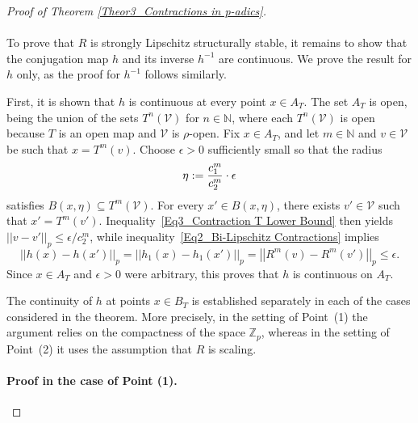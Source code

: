\documentclass[10pt,a4paper]{amsart}
\begin{document}
\begin{proof}[Proof of Theorem \ref{Theor3_Contractions in p-adics}]
		
		
		\paragraph{} 
		
		To prove that $R$ is strongly Lipschitz structurally stable, it remains to show that the conjugation map $h$ and its inverse $h^{-1}$ are continuous. 
		We prove the result for $h$ only, as the proof for $h^{-1}$ follows similarly. 
		
		\medskip
		
		First, it is shown that $h$ is continuous at every point $x \in A_{T}$. The set $A_{T}$ is open, being the union of the sets $T^{n} \left(  \mathcal{V}  \right) $ for $n \in \mathbb{N} $, where each $T^{n} \left(  \mathcal{V}  \right)  $ is open because $T$ is an open map and $\mathcal{V}$ is $\rho$-open. 
		Fix $x \in A_{T} $, and let $m \in \mathbb{N} $ and $v \in \mathcal{V}$ be such that $x = T^{m}(v)$. Choose $  \epsilon > 0$ sufficiently small so that the radius 
		$$  \eta :=   {c_{1}^{m} \over c_{2}^{m}} \cdot  \epsilon $$
		satisfies $B \left(  x,  \eta  \right)  \subseteq T^{m} \left(  \mathcal{V}  \right)  $. 
		For every $x' \in B \left(  x ,  \eta  \right) $, there exists $v' \in \mathcal{V}$ such that $x' = T^{m} \left(  v'  \right) $. Inequality~\eqref{Eq3_Contraction T Lower Bound} then yields  $ \left| \left|  v - v'  \right|  \right|_{p} \le \epsilon / c_{2}^{m}$, while inequality~\eqref{Eq2_Bi-Lipschitz Contractions} implies  
		$$  \left| \left|  h \left(  x  \right)  - h \left(  x'  \right)   \right|  \right|_{p}   =    \left| \left|  h_{1}(x) - h_{1} \left(  x' \right)   \right|  \right|_{p}   =    \left| \left|  R^{m} \left(  v  \right)  - R^{m} \left(  v'  \right)   \right|  \right|_{p}   \le    \epsilon . $$ 	
		Since $x \in A_{T}$ and $\epsilon  > 0$ were arbitrary, this proves that $h$ is continuous on $A_{T}$. 
		
		
		\medskip
		
		The continuity of $h$ at points $x \in B_{T}$ is established separately in each of the cases considered in the theorem. More precisely, in the setting of Point~(1) the argument relies on the compactness of the space $\mathbb{Z}_{p}$, whereas in the setting of Point~(2) it uses the assumption that $R$ is scaling.
		
		
		\paragraph{Proof in the case of Point (1).} 
		

\end{proof}
\end{document}
